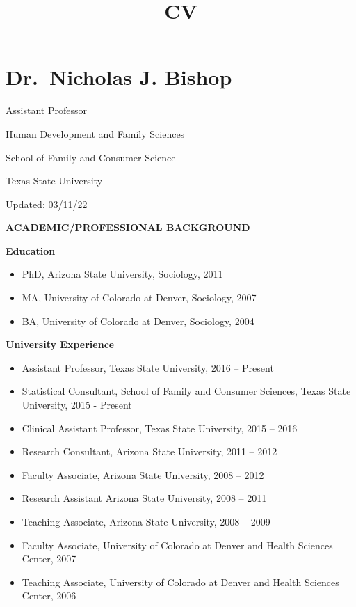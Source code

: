 \documentclass[
]{article}
\title{CV}
\author{}
\date{\vspace{-2.5em}}
\begin{document}
\maketitle

\hypertarget{dr.-nicholas-j.-bishop}{%
\section{\texorpdfstring{\textbf{Dr.~Nicholas J.
Bishop}}{Dr.~Nicholas J. Bishop}}\label{dr.-nicholas-j.-bishop}}

Assistant Professor

Human Development and Family Sciences

School of Family and Consumer Science

Texas State University

Updated: 03/11/22

\uline{\textbf{ACADEMIC/PROFESSIONAL BACKGROUND}}

\textbf{Education}

\begin{itemize}
\item
  PhD, Arizona State University, Sociology, 2011
\item
  MA, University of Colorado at Denver, Sociology, 2007
\item
  BA, University of Colorado at Denver, Sociology, 2004
\end{itemize}

\textbf{University Experience}

\begin{itemize}
\item
  Assistant Professor, Texas State University, 2016 -- Present
\item
  Statistical Consultant, School of Family and Consumer Sciences, Texas
  State University, 2015 - Present
\item
  Clinical Assistant Professor, Texas State University, 2015 -- 2016
\item
  Research Consultant, Arizona State University, 2011 -- 2012
\item
  Faculty Associate, Arizona State University, 2008 -- 2012
\item
  Research Assistant Arizona State University, 2008 -- 2011
\item
  Teaching Associate, Arizona State University, 2008 -- 2009
\item
  Faculty Associate, University of Colorado at Denver and Health
  Sciences Center, 2007
\item
  Teaching Associate, University of Colorado at Denver and Health
  Sciences Center, 2006
\end{itemize}
\end{document}
